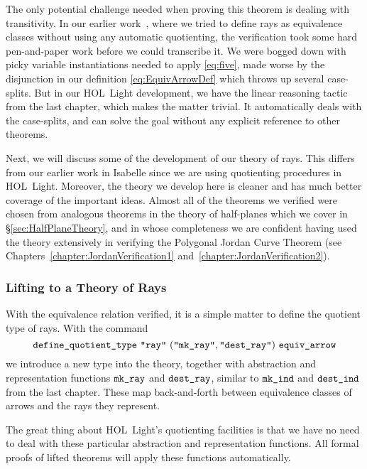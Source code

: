 \label{sec:RayTransitivity}The only potential challenge needed when proving this theorem is dealing with transitivity. In our earlier work~\cite{ScottMScThesis}, where we tried to define rays as equivalence classes without using any automatic quotienting, the verification took some hard pen-and-paper work before we could transcribe it. We were bogged down with picky variable instantiations needed to apply \ref{eq:five}, made worse by the disjunction in our definition \eqref{eq:EquivArrowDef} which throws up several case-splits. But in our HOL~Light development, we have the linear reasoning tactic from the last chapter, which makes the matter trivial. It automatically deals with the case-splits, and can solve the goal without any explicit reference to other theorems.

Next, we will discuss some of the development of our theory of rays. This differs from our earlier work in Isabelle since we are using quotienting procedures in HOL~Light. Moreover, the theory we develop here is cleaner and has much better coverage of the important ideas. Almost all of the theorems we verified were chosen from analogous theorems in the theory of half-planes which we cover in \S\ref{sec:HalfPlaneTheory}, and in whose completeness we are confident having used the theory extensively in verifying the Polygonal Jordan Curve Theorem (see Chapters~\ref{chapter:JordanVerification1} and~\ref{chapter:JordanVerification2}).

\subsubsection{Lifting to a Theory of Rays}
With the equivalence relation verified, it is a simple matter to define the quotient type of rays. With the command
\begin{displaymath}
  \code{define\_quotient\_type}\ \code{"ray"}\ (\code{"mk\_ray"},\code{"dest\_ray"})\ \code{equiv\_arrow}
\end{displaymath}
we introduce a new type  into the theory, together with abstraction and representation functions $\texttt{mk\_ray}$ and $\texttt{dest\_ray}$, similar to $\texttt{mk\_ind}$ and $\texttt{dest\_ind}$ from the last chapter. These map back-and-forth between equivalence classes of arrows and the rays they represent. 

The great thing about HOL~Light's quotienting facilities is that we have no need to deal with these particular abstraction and representation functions. All formal proofs of lifted theorems will apply these functions automatically. 

